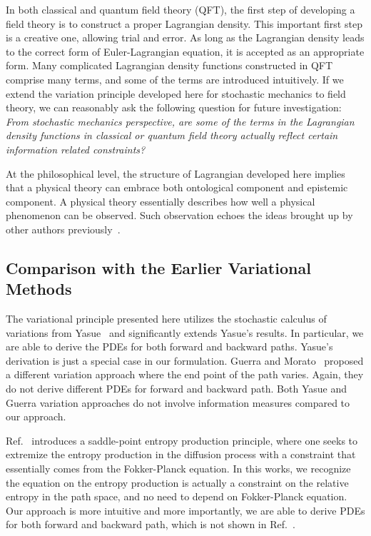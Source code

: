 \documentclass[%
 aip, 
 amsmath,amssymb,amsthm,
 nofootinbib,
 reprint,
]{revtex4-1}
\begin{document}
In both classical and quantum field theory (QFT), the first step of developing a field theory is to construct a proper Lagrangian density. This important first step is a creative one, allowing trial and error. As long as the Lagrangian density leads to the correct form of Euler-Lagrangian equation, it is accepted as an appropriate form. Many complicated Lagrangian density functions constructed in QFT comprise many terms, and some of the terms are introduced intuitively. If we extend the variation principle developed here for stochastic mechanics to field theory, we can reasonably ask the following question for future investigation: \textit{From stochastic mechanics perspective, are some of the terms in the Lagrangian density functions in classical or quantum field theory actually reflect certain information related constraints?}

At the philosophical level, the structure of Lagrangian developed here implies that a physical theory can embrace both ontological component and epistemic component. A physical theory essentially describes how well a physical phenomenon can be observed. Such observation echoes the ideas brought up by other authors previously~\cite{Wheeler, FriedenBook}. 


\subsection{Comparison with the Earlier Variational Methods}
The variational principle presented here utilizes the stochastic calculus of variations from Yasue~\cite{Yasue} and significantly extends Yasue's results. In particular, we are able to derive the PDEs for both forward and backward paths. Yasue's derivation is just a special case in our formulation. Guerra and Morato~\cite{Guerra} proposed a different variation approach where the end point of the path varies. Again, they do not derive different PDEs for forward and backward path. Both Yasue and Guerra variation approaches do not involve information measures compared to our approach.

Ref.~\cite{Pavon} introduces a saddle-point entropy production principle, where one seeks to extremize the entropy production in the diffusion process with a constraint that essentially comes from the Fokker-Planck equation. In this works, we recognize the equation on the entropy production is actually a constraint on the relative entropy in the path space, and no need to depend on Fokker-Planck equation. Our approach is more intuitive and more importantly, we are able to derive PDEs for both forward and backward path, which is not shown in Ref.~\cite{Pavon}.
\end{document}
